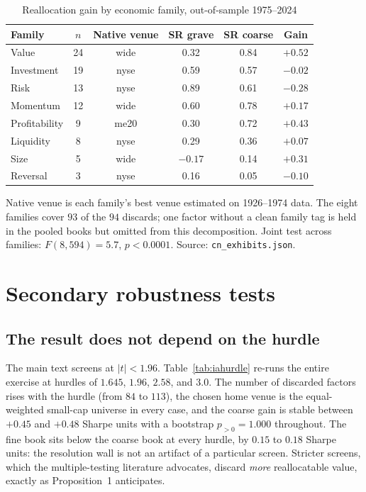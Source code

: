 \documentclass[12pt]{article}
\theoremstyle{plain}
\theoremstyle{definition}
\begin{document}
\begin{table}[t]
\centering
\caption{Reallocation gain by economic family, out-of-sample 1975--2024}
\label{tab:iafamily}
\begin{threeparttable}
\begin{tabular}{lccccc}
\toprule
Family & $n$ & Native venue & SR grave & SR coarse & Gain \\
\midrule
Value         & 24 & wide & 0.32 & 0.84 & $+0.52$ \\
Investment    & 19 & nyse & 0.59 & 0.57 & $-0.02$ \\
Risk          & 13 & nyse & 0.89 & 0.61 & $-0.28$ \\
Momentum      & 12 & wide & 0.60 & 0.78 & $+0.17$ \\
Profitability &  9 & me20 & 0.30 & 0.72 & $+0.43$ \\
Liquidity     &  8 & nyse & 0.29 & 0.36 & $+0.07$ \\
Size          &  5 & wide & $-0.17$ & 0.14 & $+0.31$ \\
Reversal      &  3 & nyse & 0.16 & 0.05 & $-0.10$ \\
\bottomrule
\end{tabular}
\begin{tablenotes}\footnotesize
\item Native venue is each family's best venue estimated on 1926--1974 data. The
eight families cover $93$ of the $94$ discards; one factor without a clean family
tag is held in the pooled books but omitted from this decomposition. Joint test
across families: $F(8,594)=5.7$, $p<0.0001$. Source: \texttt{cn\_exhibits.json}.
\end{tablenotes}
\end{threeparttable}
\end{table}

\section{Secondary robustness tests}
\label{ia:robust}

\subsection{The result does not depend on the hurdle}

The main text screens at $|t|<1.96$. Table~\ref{tab:iahurdle} re-runs the entire
exercise at hurdles of $1.645$, $1.96$, $2.58$, and $3.0$. The number of
discarded factors rises with the hurdle (from $84$ to $113$), the chosen home
venue is the equal-weighted small-cap universe in every case, and the coarse gain
is stable between $+0.45$ and $+0.48$ Sharpe units with a bootstrap $p_{>0}=1.000$
throughout. The fine book sits below the coarse book at every hurdle,
by $0.15$ to $0.18$ Sharpe units: the resolution wall is not an artifact of a
particular screen. Stricter screens, which the multiple-testing literature
advocates, discard \emph{more} reallocatable value, exactly as
Proposition~1 anticipates.
\end{document}
